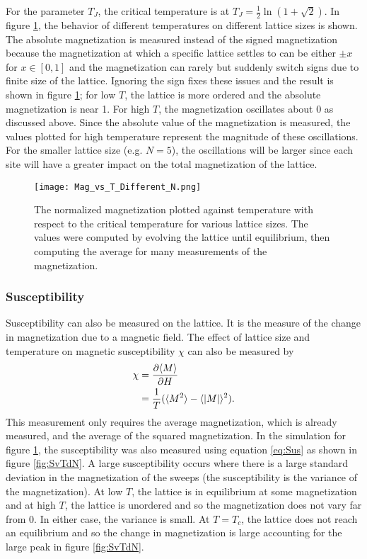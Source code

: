 \documentclass[11pt]{article}
\begin{document}
For the parameter $T_J$, the critical temperature is at $T_J=\frac{1}{2}\ln(1+\sqrt{2})$. In figure \ref{fig:MvTdN}, the behavior of different temperatures on different lattice sizes is shown. The absolute magnetization is measured instead of the signed magnetization because the magnetization at which a specific lattice settles to can be either $\pm x$ for $x\in[0,1]$ and the magnetization can rarely but suddenly switch signs due to finite size of the lattice. Ignoring the sign fixes these issues and the result is shown in figure \ref{fig:MvTdN}; for low $T$, the lattice is more ordered and the absolute magnetization is near 1. For high $T$, the magnetization oscillates about 0 as discussed above. Since the absolute value of the magnetization is measured, the values plotted for high temperature represent the magnitude of these oscillations. For the smaller lattice size (e.g. $N=5$), the oscillations will be larger since each site will have a greater impact on the total magnetization of the lattice.

\begin{figure}[h]
	\centering
\texttt{[image: Mag\_vs\_T\_Different\_N.png]}
	\caption{The normalized magnetization plotted against temperature with respect to the critical temperature for various lattice sizes. The values were computed by evolving the lattice until equilibrium, then computing the average for many measurements of the magnetization.}
	\label{fig:MvTdN}
\end{figure}

\subsubsection{Susceptibility}

Susceptibility can also be measured on the lattice. It is the measure of the change in magnetization due to a magnetic field. The effect of lattice size and temperature on magnetic susceptibility $\chi$ can also be measured by
\begin{align}
	\chi&=\pdv{\langle M\rangle}{H}\\
	&=\frac{1}{T}(\langle M^2\rangle-\langle \abs{M}\rangle^2).
	\label{eq:Sus}
\end{align}
This measurement only requires the average magnetization, which is already measured, and the average of the squared magnetization. In the simulation for figure \ref{fig:MvTdN}, the susceptibility was also measured using equation \ref{eq:Sus} as shown in figure \ref{fig:SvTdN}. A large susceptibility occurs where there is a large standard deviation in the magnetization of the sweeps (the susceptibility is the variance of the magnetization). At low $T$, the lattice is in equilibrium at some magnetization and at high $T$, the lattice is unordered and so the magnetization does not vary far from 0. In either case, the variance is small. At $T=T_c$, the lattice does not reach an equilibrium and so the change in magnetization is large accounting for the large peak in figure \ref{fig:SvTdN}.
\end{document}
